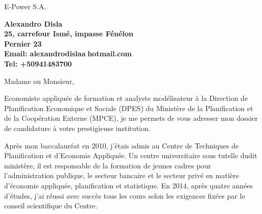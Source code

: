 \documentclass[11pt]{letter} %
\begin{document}

\begin{letter}{E-Power S.A.} 


\begin{center}
\large\bf Alexandro Disla\\ %
25, carrefour Ism\'{e}, impasse F\'{e}n\'{e}lon\\ Pernier 23 \\ %
Email: alexandrodisla\textcircled{a}hotmail.com \\
Tel: +50941483700
\end{center} 
\vfill

\signature{Alexandro Disla} %


\opening{Madame ou Monsieur,} 


	Economiste appliquée de formation et analyste modélisateur à la Direction de Planification Economique et Sociale (DPES) du Ministère de la Planification et de la Coopération Externe (MPCE), je me permets de vous adresser mon dossier de candidature à votre prestigieuse institution.
	
	Après mon baccalauréat en 2010, j’étais admis au Centre de Techniques de Planification et d’Economie Appliquée. Un centre universitaire sous tutelle dudit ministère, il est responsable de la formation de jeunes cadres pour l’administration publique, le secteur bancaire et le secteur privé en matière d’économie appliquée, planification et statistique. En 2014, après quatre années d’études, j’ai réussi avec succès tous les cours selon les exigences fixées par le conseil scientifique du Centre.
	

\end{letter}
\end{document}
